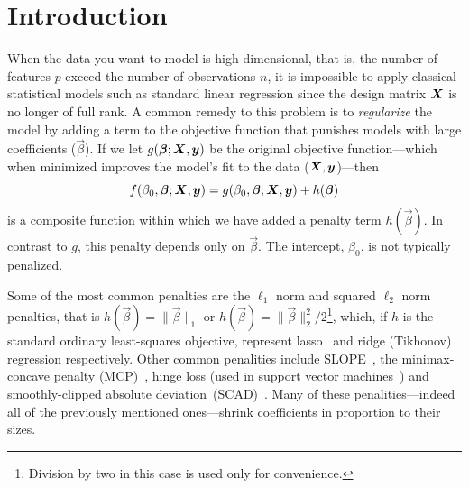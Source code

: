 \section{Introduction}

When the data you want to model is high-dimensional, that is, the number of features \(p\) exceed the number of observations \(n\), it is impossible to apply classical statistical models such as standard linear regression since the design matrix \(\boldsymbol X\) is no longer of full rank. A common remedy to this problem is to \emph{regularize} the model by adding a term to the objective function that punishes models with large coefficients (\(\vec\beta\)). If we let \(g(\boldsymbol\beta; \boldsymbol X, \boldsymbol y)\) be the original objective function---which when minimized improves the model's fit to the data (\(\boldsymbol X, \boldsymbol y\))---then
\[
  f(\beta_0, \boldsymbol\beta; \boldsymbol X, \boldsymbol y) = g(\beta_0, \boldsymbol\beta; \boldsymbol X, \boldsymbol y) + h(\boldsymbol\beta)
\]
is a composite function within which we have added a penalty term \(h(\vec\beta)\).
In contrast to \(g\), this penalty depends only on \(\vec{\beta}\).
The intercept, \(\beta_0\), is not typically penalized.

Some of the most common penalties are the \(\ell_1\) norm and squared \(\ell_2\) norm penalties, that is \(h(\vec\beta) = \lVert \vec\beta \rVert_1\) or \(h(\vec\beta) = \lVert \vec\beta \rVert_2^2/2\)\footnote{Division by two in this case is used only for convenience.}, which, if \(h\) is the standard ordinary least-squares objective, represent lasso~\citep{tibshirani1996,santosa1986,donoho1994} and ridge (Tikhonov) regression respectively.
Other common penalities include SLOPE~\citep{bogdan2013,bogdan2015}, the minimax-concave penalty (MCP)~\citep{zhang2010}, hinge loss (used in support vector machines~\citep{cortes1995}) and smoothly-clipped absolute deviation~(SCAD)~\citep{fan2001}.
Many of these penalities---indeed all of the previously mentioned ones---shrink coefficients in proportion to their sizes.

